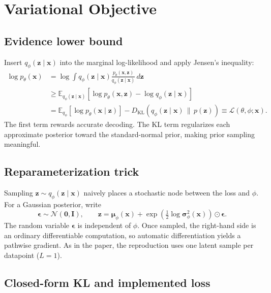 \documentclass[11pt]{article}
\newcommand{\E}{\mathbb{E}}
\newcommand{\KL}{D_{\mathrm{KL}}}
\begin{document}
\section{Variational Objective}

\subsection{Evidence lower bound}

Insert $q_\phi(\bm{z}\mid\bm{x})$ into the marginal log-likelihood and apply Jensen's inequality:
\begin{align}
\log p_\theta(\bm{x})
&=\log\int q_\phi(\bm{z}\mid\bm{x})
  \frac{p_\theta(\bm{x},\bm{z})}{q_\phi(\bm{z}\mid\bm{x})}\,d\bm{z} \\
&\geq \E_{q_\phi(\bm{z}\mid\bm{x})}
\left[\log p_\theta(\bm{x},\bm{z})-\log q_\phi(\bm{z}\mid\bm{x})\right] \\
&=\E_{q_\phi}\left[\log p_\theta(\bm{x}\mid\bm{z})\right]
-\KL\!\left(q_\phi(\bm{z}\mid\bm{x})\,\|\,p(\bm{z})\right)
\equiv \mathcal{L}(\theta,\phi;\bm{x}).
\label{eq:elbo}
\end{align}
The first term rewards accurate decoding. The KL term regularizes each approximate posterior toward the standard-normal prior, making prior sampling meaningful.

\subsection{Reparameterization trick}

Sampling $\bm{z}\sim q_\phi(\bm{z}\mid\bm{x})$ naively places a stochastic node between the loss and $\phi$. For a Gaussian posterior, write
\begin{equation}
  \bm{\epsilon}\sim\mathcal{N}(\bm{0},\bm{I}),
  \qquad
  \bm{z}=\bm{\mu}_\phi(\bm{x})+
  \exp\!\left(\tfrac12\log\bm{\sigma}_\phi^2(\bm{x})\right)\odot\bm{\epsilon}.
  \label{eq:reparam}
\end{equation}
The random variable $\bm{\epsilon}$ is independent of $\phi$. Once sampled, the right-hand side is an ordinary differentiable computation, so automatic differentiation yields a pathwise gradient. As in the paper, the reproduction uses one latent sample per datapoint ($L=1$).

\subsection{Closed-form KL and implemented loss}
\end{document}

